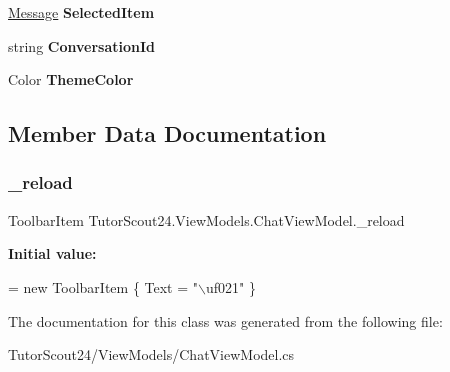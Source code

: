 \begin{DoxyCompactItemize}
\mbox{\hyperlink{class_tutor_scout24_1_1_models_1_1_chat_1_1_message}{Message}} {\bfseries Selected\+Item}
\item 
\mbox{\label{class_tutor_scout24_1_1_view_models_1_1_chat_view_model_a252746c3bf69ebe011ed9023b8acd3e3}} 
string {\bfseries Conversation\+Id}
\item 
\mbox{\label{class_tutor_scout24_1_1_view_models_1_1_chat_view_model_af93ff2eaaf62c8ee2b5645ee6a9608e9}} 
Color {\bfseries Theme\+Color}
\end{DoxyCompactItemize}


\subsection{Member Data Documentation}
\mbox{\label{class_tutor_scout24_1_1_view_models_1_1_chat_view_model_a436239b9dcfd275c018fe0accad173af}} 
\subsubsection{\texorpdfstring{\+\_\+reload}{\_reload}}
{\footnotesize\ttfamily Toolbar\+Item Tutor\+Scout24.\+View\+Models.\+Chat\+View\+Model.\+\_\+reload}

{\bfseries Initial value\+:}
\begin{DoxyCode}
= \textcolor{keyword}{new} ToolbarItem
        \{
            Text = \textcolor{stringliteral}{"\(\backslash\)uf021"}
        \}
\end{DoxyCode}


The documentation for this class was generated from the following file\+:\begin{DoxyCompactItemize}
\item 
Tutor\+Scout24/\+View\+Models/Chat\+View\+Model.\+cs\end{DoxyCompactItemize}
